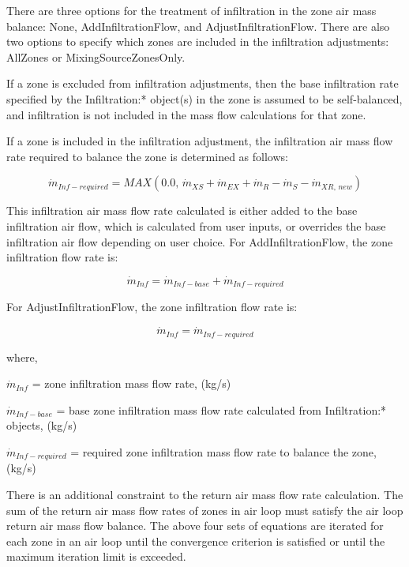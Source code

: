 There are three options for the treatment of infiltration in the zone air mass balance: None, AddInfiltrationFlow, and AdjustInfiltrationFlow. There are also two options to specify which zones are included in the infiltration adjustments: AllZones or MixingSourceZonesOnly.

If a zone is excluded from infiltration adjustments, then the base infiltration rate specified by the Infiltration:* object(s) in the zone is assumed to be self-balanced, and infiltration is not included in the mass flow calculations for that zone.

If a zone is included in the infiltration adjustment, the infiltration air mass flow rate required to balance the zone is determined as follows:

\begin{equation}
{\dot m_{Inf-required}} = MAX\left( {0.0,\,{{\dot m}_{XS}} + {{\dot m}_{EX}} + {{\dot m}_{R}} - {{\dot m}_S}  - {\dot m_{XR,\,new}}} \right)
\end{equation}

This infiltration air mass flow rate calculated is either added to the base infiltration air flow, which is calculated from user inputs, or overrides the base infiltration air flow depending on user choice. For AddInfiltrationFlow, the zone infiltration flow rate is:

\begin{equation}
{\dot m_{Inf}} = {\dot m_{Inf-base}} + {\dot m_{Inf-required}}
\end{equation}

For AdjustInfiltrationFlow, the zone infiltration flow rate is:

\begin{equation}
{\dot m_{Inf}} = {\dot m_{Inf-required}}
\end{equation}

where,

\({\dot m_{Inf}}\) = zone infiltration mass flow rate, (kg/s)

\({\dot m_{Inf-base}}\) = base zone infiltration mass flow rate calculated from Infiltration:* objects, (kg/s)

\({\dot m_{Inf-required}}\) = required zone infiltration mass flow rate to balance the zone, (kg/s)

There is an additional constraint to the return air mass flow rate calculation. The sum of the return air mass flow rates of zones in air loop must satisfy the air loop return air mass flow balance. The above four sets of equations are iterated for each zone in an air loop until the convergence criterion is satisfied or until the maximum iteration limit is exceeded.

